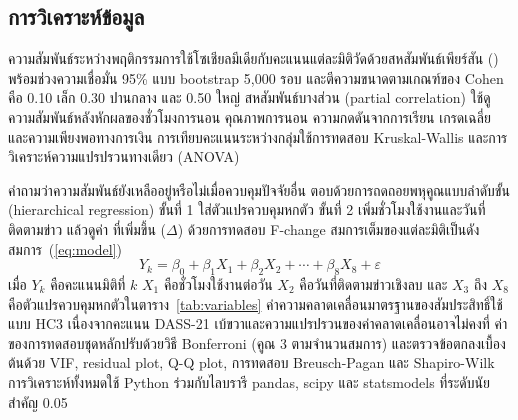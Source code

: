 \subsection{การวิเคราะห์ข้อมูล}

ความสัมพันธ์ระหว่างพฤติกรรมการใช้โซเชียลมีเดียกับคะแนนแต่ละมิติวัดด้วยสหสัมพันธ์เพียร์สัน ()
พร้อมช่วงความเชื่อมั่น 95\% แบบ bootstrap 5,000 รอบ
และตีความขนาดตามเกณฑ์ของ Cohen \cite{cohen1988statistical}
คือ 0.10 เล็ก 0.30 ปานกลาง และ 0.50 ใหญ่
สหสัมพันธ์บางส่วน (partial correlation) ใช้ดูความสัมพันธ์หลังหักผลของชั่วโมงการนอน
คุณภาพการนอน ความกดดันจากการเรียน เกรดเฉลี่ย และความเพียงพอทางการเงิน
การเทียบคะแนนระหว่างกลุ่มใช้การทดสอบ Kruskal-Wallis และการวิเคราะห์ความแปรปรวนทางเดียว (ANOVA)

คำถามว่าความสัมพันธ์ยังเหลืออยู่หรือไม่เมื่อควบคุมปัจจัยอื่น
ตอบด้วยการถดถอยพหุคูณแบบลำดับขั้น (hierarchical regression)
ขั้นที่ 1 ใส่ตัวแปรควบคุมหกตัว ขั้นที่ 2 เพิ่มชั่วโมงใช้งานและวันที่ติดตามข่าว
แล้วดูค่า \Rsq{} ที่เพิ่มขึ้น ($\Delta$\Rsq) ด้วยการทดสอบ F-change
สมการเต็มของแต่ละมิติเป็นดังสมการ~(\ref{eq:model})
%
\begin{equation}
    Y_k = \beta_0 + \beta_1 X_1 + \beta_2 X_2 + \cdots + \beta_8 X_8 + \varepsilon
    \label{eq:model}
\end{equation}
%
เมื่อ $Y_k$ คือคะแนนมิติที่ $k$ $X_1$ คือชั่วโมงใช้งานต่อวัน $X_2$ คือวันที่ติดตามข่าวเชิงลบ
และ $X_3$ ถึง $X_8$ คือตัวแปรควบคุมหกตัวในตาราง~\ref{tab:variables}
ค่าความคลาดเคลื่อนมาตรฐานของสัมประสิทธิ์ใช้แบบ HC3
เนื่องจากคะแนน DASS-21 เบ้ขวาและความแปรปรวนของค่าคลาดเคลื่อนอาจไม่คงที่
ค่า  ของการทดสอบชุดหลักปรับด้วยวิธี Bonferroni (คูณ 3 ตามจำนวนสมการ)
และตรวจข้อตกลงเบื้องต้นด้วย VIF, residual plot, Q-Q plot, การทดสอบ Breusch-Pagan
และ Shapiro-Wilk
การวิเคราะห์ทั้งหมดใช้ Python ร่วมกับไลบรารี pandas, scipy และ statsmodels
ที่ระดับนัยสำคัญ 0.05
